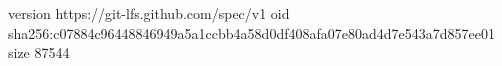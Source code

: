 version https://git-lfs.github.com/spec/v1
oid sha256:c07884c96448846949a5a1ccbb4a58d0df408afa07e80ad4d7e543a7d857ee01
size 87544

